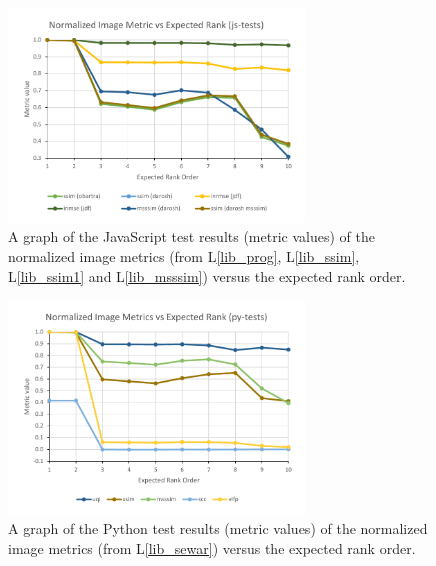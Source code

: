 \documentclass[12pt, titlepage]{article}
\newcommand{\lref}[1]{L\ref{#1}}
\begin{document}
\begin{figure}[h!]
  \begin{center}
  \includegraphics[width=0.7\textwidth]{test-analysis/js-graph.pdf}
  \caption{A graph of the JavaScript test results (metric values) of the normalized
  image metrics (from \lref{lib_prog}, \lref{lib_ssim},
  \lref{lib_ssim1} and \lref{lib_msssim}) versus the expected rank order.}
  \label{fig_js_graph}
  \end{center}
\end{figure}

\begin{figure}[h!]
  \begin{center}
  \includegraphics[width=0.7\textwidth]{test-analysis/py-graph.pdf}
  \caption{A graph of the Python test results (metric values) of the normalized
  image metrics (from \lref{lib_sewar}) versus the expected rank order.}
  \label{fig_py_graph}
  \end{center}
\end{figure}


\newpage
\clearpage
\end{document}
